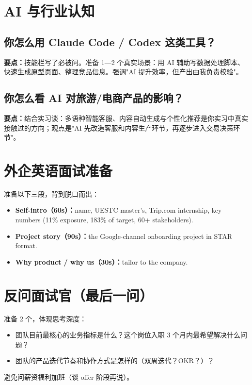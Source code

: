 \documentclass[zihao=-4,autoindent=2em]{ctexart}
\begin{document}
\section{AI 与行业认知}

\subsection{你怎么用 Claude Code / Codex 这类工具？}
\textbf{要点：}技能栏写了必被问。准备 1—2 个真实场景：用 AI 辅助写数据处理脚本、快速生成原型页面、整理竞品信息。强调"AI 提升效率，但产出由我负责校验"。

\subsection{你怎么看 AI 对旅游/电商产品的影响？}
\textbf{要点：}结合实习谈：多语种智能客服、内容自动生成与个性化推荐是你实习中真实接触过的方向；观点是"AI 先改造客服和内容生产环节，再逐步进入交易决策环节"。

\section{外企英语面试准备}

准备以下三段，背到脱口而出：
\begin{itemize}
  \item \textbf{Self-intro（60s）：}name, UESTC master's, Trip.com internship, key numbers (11\% exposure, 183\% of target, 60+ stakeholders).
  \item \textbf{Project story（90s）：}the Google-channel onboarding project in STAR format.
  \item \textbf{Why product / why us（30s）：}tailor to the company.
\end{itemize}

\section{反问面试官（最后一问）}

准备 2 个，体现思考深度：
\begin{itemize}
  \item 团队目前最核心的业务指标是什么？这个岗位入职 3 个月内最希望解决什么问题？
  \item 团队的产品迭代节奏和协作方式是怎样的（双周迭代？OKR？）？
\end{itemize}
避免问薪资福利加班（谈 offer 阶段再说）。
\end{document}

